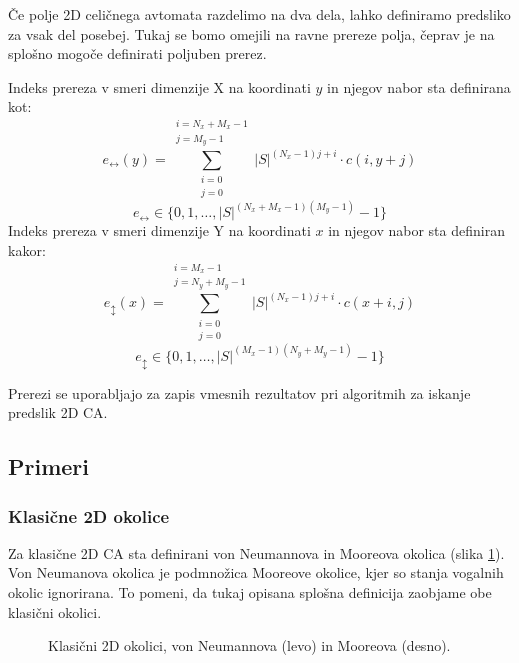 \documentclass[12pt,a4paper,openany,twoside]{book}
\begin{document}
Če polje 2D celičnega avtomata razdelimo na dva dela,
lahko definiramo predsliko za vsak del posebej.
Tukaj se bomo omejili na ravne prereze polja,
čeprav je na splošno mogoče definirati poljuben prerez.

Indeks prereza v smeri dimenzije X na koordinati \(y\) in njegov nabor sta definirana kot:
\begin{equation}
e_{\leftrightarrow}(y) = \sum_{\substack{i=0 \\ j=0}}^{\substack{i=N_x+M_x-1 \\ j=M_y-1}} |S|^{(N_x-1) j + i} \cdot c(i,y+j)
\end{equation}
\begin{equation}
e_{\leftrightarrow} \in \{0, 1, \ldots, |S|^{(N_x+M_x-1)(M_y-1)}-1\}
\end{equation}
Indeks prereza v smeri dimenzije Y na koordinati \(x\) in njegov nabor sta definiran kakor:
\begin{equation}
e_{\updownarrow}(x) = \sum_{\substack{i=0 \\ j=0}}^{\substack{i=M_x-1 \\ j=N_y+M_y-1}} |S|^{(N_x-1) j + i} \cdot c(x+i,j)
\end{equation}
\begin{equation}
e_{\updownarrow} \in \{0, 1, \ldots, |S|^{(M_x-1)(N_y+M_y-1)}-1\}
\end{equation}

Prerezi se uporabljajo za zapis vmesnih rezultatov pri algoritmih za iskanje predslik 2D CA.

\subsection{Primeri}

\subsubsection{Klasične 2D okolice}

Za klasične 2D CA sta definirani von Neumannova in Mooreova okolica (slika \ref{neighborhood_classic}).
Von Neumanova okolica je podmnožica Mooreove okolice, kjer so stanja vogalnih okolic ignorirana.
To pomeni, da tukaj opisana splošna definicija zaobjame obe klasični okolici.

\vspace{5mm}
\begin{figure}[htb]
\centerline{}
\caption[Klasične 2D okolice.]
{Klasični 2D okolici, von Neumannova (levo) in Mooreova (desno).}
\label{neighborhood_classic}
\end{figure}
\end{document}
